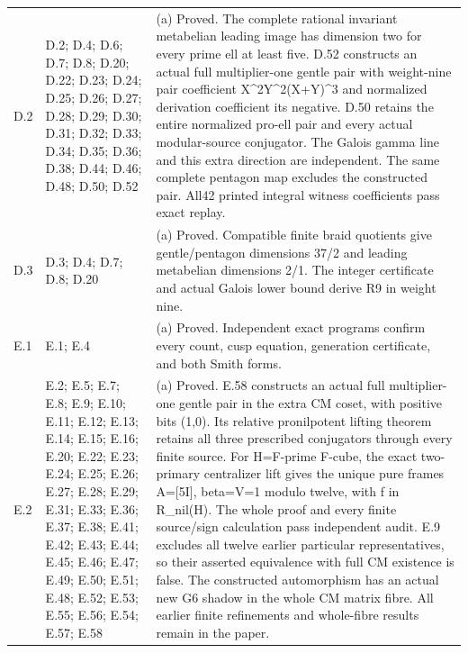 \begin{longtable}{@{}p{1.1cm}p{3.0cm}p{10.3cm}@{}}
D.2 & D.2; D.4; D.6; D.7; D.8; D.20; D.22; D.23; D.24; D.25; D.26; D.27; D.28; D.29; D.30; D.31; D.32; D.33; D.34; D.35; D.36; D.38; D.44; D.46; D.48; D.50; D.52 & (a) Proved. The complete rational invariant metabelian leading image has dimension two for every prime ell at least five. D.52 constructs an actual full multiplier-one gentle pair with weight-nine pair coefficient X\textasciicircum{}2Y\textasciicircum{}2(X+Y)\textasciicircum{}3 and normalized derivation coefficient its negative. D.50 retains the entire normalized pro-ell pair and every actual modular-source conjugator. The Galois gamma line and this extra direction are independent. The same complete pentagon map excludes the constructed pair. All42 printed integral witness coefficients pass exact replay. \\
D.3 & D.3; D.4; D.7; D.8; D.20 & (a) Proved. Compatible finite braid quotients give gentle/pentagon dimensions 37/2 and leading metabelian dimensions 2/1. The integer certificate and actual Galois lower bound derive R9 in weight nine. \\
E.1 & E.1; E.4 & (a) Proved. Independent exact programs confirm every count, cusp equation, generation certificate, and both Smith forms. \\
E.2 & E.2; E.5; E.7; E.8; E.9; E.10; E.11; E.12; E.13; E.14; E.15; E.16; E.20; E.22; E.23; E.24; E.25; E.26; E.27; E.28; E.29; E.31; E.33; E.36; E.37; E.38; E.41; E.42; E.43; E.44; E.45; E.46; E.47; E.49; E.50; E.51; E.48; E.52; E.53; E.55; E.56; E.54; E.57; E.58 & (a) Proved. E.58 constructs an actual full multiplier-one gentle pair in the extra CM coset, with positive bits (1,0). Its relative pronilpotent lifting theorem retains all three prescribed conjugators through every finite source. For H=F-prime F-cube, the exact two-primary centralizer lift gives the unique pure frames A=[5I], beta=V=1 modulo twelve, with f in R\_nil(H). The whole proof and every finite source/sign calculation pass independent audit. E.9 excludes all twelve earlier particular representatives, so their asserted equivalence with full CM existence is false. The constructed automorphism has an actual new G6 shadow in the whole CM matrix fibre. All earlier finite refinements and whole-fibre results remain in the paper. \\

\end{longtable}
